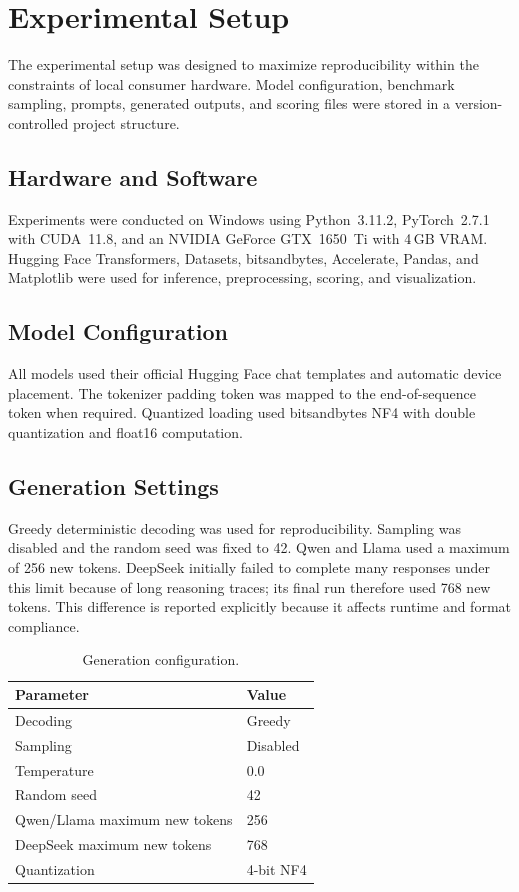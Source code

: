 \documentclass{article}
\begin{document}
\section{Experimental Setup}

The experimental setup was designed to maximize reproducibility within the constraints of local consumer hardware. Model configuration, benchmark sampling, prompts, generated outputs, and scoring files were stored in a version-controlled project structure.

\subsection{Hardware and Software}

Experiments were conducted on Windows using Python~3.11.2, PyTorch~2.7.1 with CUDA~11.8, and an NVIDIA GeForce GTX~1650~Ti with 4\,GB VRAM. Hugging Face Transformers, Datasets, bitsandbytes, Accelerate, Pandas, and Matplotlib were used for inference, preprocessing, scoring, and visualization.

\subsection{Model Configuration}

All models used their official Hugging Face chat templates and automatic device placement. The tokenizer padding token was mapped to the end-of-sequence token when required. Quantized loading used bitsandbytes NF4 with double quantization and float16 computation.

\subsection{Generation Settings}

Greedy deterministic decoding was used for reproducibility. Sampling was disabled and the random seed was fixed to 42. Qwen and Llama used a maximum of 256 new tokens. DeepSeek initially failed to complete many responses under this limit because of long reasoning traces; its final run therefore used 768 new tokens. This difference is reported explicitly because it affects runtime and format compliance.

\begin{table}[h]
\centering
\caption{Generation configuration.}
\label{tab:generation}
\begin{tabular}{ll}
\toprule
\textbf{Parameter} & \textbf{Value} \\
\midrule
Decoding & Greedy \\
Sampling & Disabled \\
Temperature & 0.0 \\
Random seed & 42 \\
Qwen/Llama maximum new tokens & 256 \\
DeepSeek maximum new tokens & 768 \\
Quantization & 4-bit NF4 \\
\bottomrule
\end{tabular}
\end{table}
\end{document}
